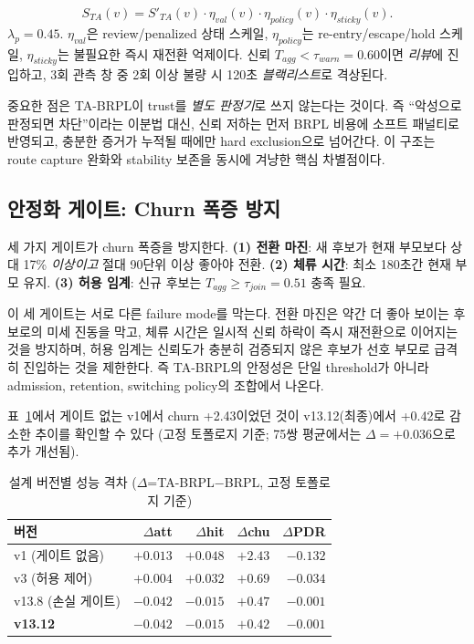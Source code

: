 \documentclass[10pt,a4paper,twocolumn]{article}
\begin{document}
\begin{equation}
  S_{TA}(v)=S'_{TA}(v)\cdot\eta_{val}(v)\cdot\eta_{policy}(v)\cdot\eta_{sticky}(v).
  \label{eq:full}
\end{equation}
$\lambda_p=0.45$. $\eta_{val}$은 review/penalized 상태 스케일,
$\eta_{policy}$는 re-entry/escape/hold 스케일,
$\eta_{sticky}$는 불필요한 즉시 재전환 억제이다.
신뢰 $T_{agg}<\tau_{warn}=0.60$이면 \emph{리뷰}에 진입하고,
3회 관측 창 중 2회 이상 불량 시 120초 \emph{블랙리스트}로 격상된다.

중요한 점은 TA-BRPL이 trust를 \emph{별도 판정기}로 쓰지 않는다는 것이다.
즉 ``악성으로 판정되면 차단''이라는 이분법 대신,
신뢰 저하는 먼저 BRPL 비용에 소프트 패널티로 반영되고,
충분한 증거가 누적될 때에만 hard exclusion으로 넘어간다.
이 구조는 route capture 완화와 stability 보존을 동시에 겨냥한 핵심 차별점이다.

\subsection{안정화 게이트: Churn 폭증 방지}

세 가지 게이트가 churn 폭증을 방지한다.
\textbf{(1) 전환 마진}: 새 후보가 현재 부모보다 상대 17\% \emph{이상이고} 절대 90단위 이상 좋아야 전환.
\textbf{(2) 체류 시간}: 최소 180초간 현재 부모 유지.
\textbf{(3) 허용 임계}: 신규 후보는 $T_{agg}\ge\tau_{join}=0.51$ 충족 필요.

이 세 게이트는 서로 다른 failure mode를 막는다.
전환 마진은 약간 더 좋아 보이는 후보로의 미세 진동을 막고,
체류 시간은 일시적 신뢰 하락이 즉시 재전환으로 이어지는 것을 방지하며,
허용 임계는 신뢰도가 충분히 검증되지 않은 후보가
선호 부모로 급격히 진입하는 것을 제한한다.
즉 TA-BRPL의 안정성은 단일 threshold가 아니라
admission, retention, switching policy의 조합에서 나온다.

표~\ref{tab:versions}에서 게이트 없는 v1에서 churn +2.43이었던 것이
v13.12(최종)에서 +0.42로 감소한 추이를 확인할 수 있다
(고정 토폴로지 기준; 75쌍 평균에서는 $\Delta=+0.036$으로 추가 개선됨).

\begin{table}[t]
\centering\small
\caption{설계 버전별 성능 격차 ($\Delta$=TA-BRPL$-$BRPL, 고정 토폴로지 기준)}
\label{tab:versions}
\begin{tabular}{lrrrr}
\toprule
버전 & $\Delta$att & $\Delta$hit & $\Delta$chu & $\Delta$PDR \\
\midrule
v1 (게이트 없음)    & $+0.013$ & $+0.048$ & $+2.43$ & $-0.132$ \\
v3 (허용 제어)      & $+0.004$ & $+0.032$ & $+0.69$ & $-0.034$ \\
v13.8 (손실 게이트) & $-0.042$ & $-0.015$ & $+0.47$ & $-0.001$ \\
\textbf{v13.12}     & $\mathbf{-0.042}$ & $\mathbf{-0.015}$
                    & $\mathbf{+0.42}$ & $\mathbf{-0.001}$ \\
\bottomrule
\end{tabular}
\end{table}
\end{document}
